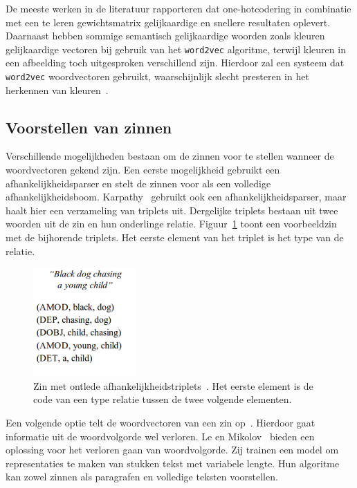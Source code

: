  De meeste werken in de literatuur rapporteren dat one-hotcodering in combinatie met een te leren gewichtsmatrix gelijkaardige en snellere resultaten oplevert. Daarnaast hebben sommige semantisch gelijkaardige woorden zoals kleuren gelijkaardige vectoren bij gebruik van het \texttt{word2vec} algoritme, terwijl kleuren in een afbeelding toch uitgesproken verschillend zijn. Hierdoor zal een systeem dat \texttt{word2vec} woordvectoren gebruikt, waarschijnlijk slecht presteren in het herkennen van kleuren~\cite{Karpathy2015}.
 
\subsection{Voorstellen van zinnen}
 Verschillende mogelijkheden bestaan om de zinnen voor te stellen wanneer de woordvectoren gekend zijn. Een eerste mogelijkheid gebruikt een afhankelijkheidsparser en stelt de zinnen voor als een volledige afhankelijkheidsboom\cite{Socher2014}. Karpathy~\cite{Karpathy2014} gebruikt ook een afhankelijkheidsparser, maar haalt hier een verzameling van triplets uit. Dergelijke triplets bestaan uit twee woorden uit de zin en hun onderlinge relatie. Figuur~\ref{fig:deprelations} toont een voorbeeldzin met de bijhorende triplets. Het eerste element van het triplet is het type van de relatie.

 \begin{figure}[tb]
     \centering
     \includegraphics[width=0.35\textwidth]{Images/dep_relations}
     \caption[Zin met ontlede afhankelijkheidstriplets]{Zin met ontlede afhankelijkheidstriplets~\cite{Karpathy2014}. Het eerste element is de code van een type relatie tussen de twee volgende elementen.}
     \label{fig:deprelations}
 \end{figure}

 Een volgende optie telt de woordvectoren van een zin op~\cite{Lebret2013}.  Hierdoor gaat informatie uit de woordvolgorde wel verloren. Le en Mikolov~\cite{Le2014a} bieden een oplossing voor het verloren gaan van woordvolgorde. Zij trainen een model om representaties te maken van stukken tekst met variabele lengte. Hun algoritme kan zowel zinnen als paragrafen en volledige teksten voorstellen.

